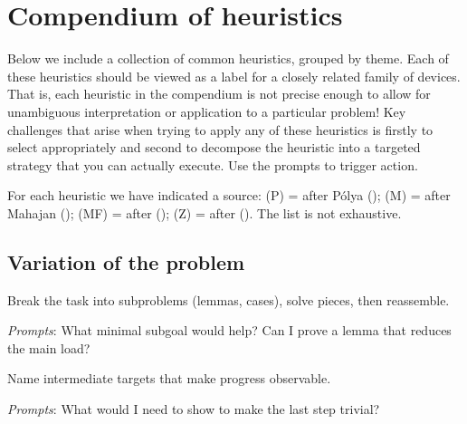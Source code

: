 \documentclass[
  a4paper,
  DIV=11,
  numbers=noendperiod,
  oneside]{scrreprt}
\begin{document}
\section{Compendium of heuristics}\label{compendium-of-heuristics}

Below we include a collection of common heuristics, grouped by theme.
Each of these heuristics should be viewed as a label for a closely
related family of devices. That is, each heuristic in the compendium is
not precise enough to allow for unambiguous interpretation or
application to a particular problem! Key challenges that arise when
trying to apply any of these heuristics is firstly to select
appropriately and second to decompose the heuristic into a targeted
strategy that you can actually execute. Use the prompts to trigger
action.

For each heuristic we have indicated a source: (P) = after Pólya
(); (M) = after Mahajan
(); (MF) = after
();
(Z) = after (). The list is not
exhaustive.

\subsection*{Variation of the problem}\label{variation-of-the-problem}

\begin{tcolorbox}[enhanced jigsaw, opacitybacktitle=0.6, colframe=quarto-callout-note-color-frame, bottomrule=.15mm, coltitle=black, colback=white, title={Decomposing and recombining (P, Z)}, breakable, toptitle=1mm, arc=.35mm, left=2mm, opacityback=0, rightrule=.15mm, bottomtitle=1mm, colbacktitle=quarto-callout-note-color!10!white, toprule=.15mm, leftrule=.75mm, titlerule=0mm]

Break the task into subproblems (lemmas, cases), solve pieces, then
reassemble.

\emph{Prompts}: What minimal subgoal would help? Can I prove a lemma
that reduces the main load?

\end{tcolorbox}

\begin{tcolorbox}[enhanced jigsaw, opacitybacktitle=0.6, colframe=quarto-callout-note-color-frame, bottomrule=.15mm, coltitle=black, colback=white, title={Establishing and using subgoals (P, Z)}, breakable, toptitle=1mm, arc=.35mm, left=2mm, opacityback=0, rightrule=.15mm, bottomtitle=1mm, colbacktitle=quarto-callout-note-color!10!white, toprule=.15mm, leftrule=.75mm, titlerule=0mm]

Name intermediate targets that make progress observable.

\emph{Prompts}: What would I need to show to make the last step trivial?

\end{tcolorbox}
\end{document}
